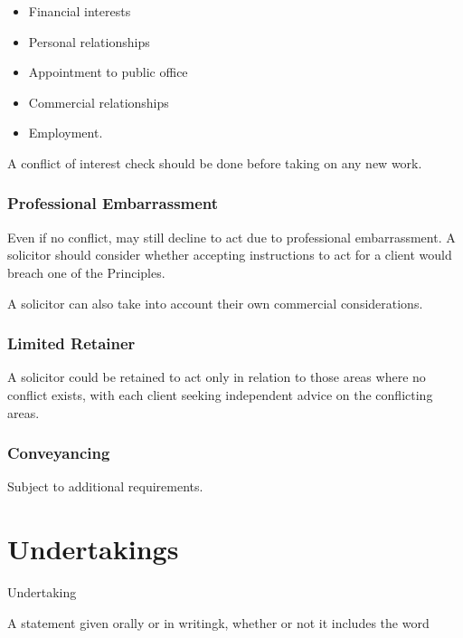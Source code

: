 \documentclass[
]{article}
\providecommand{\tightlist}{%
  \setlength{\itemsep}{0pt}\setlength{\parskip}{0pt}}
\newenvironment{env-86a00e9b-0e00-4fe8-86cd-090a54119c0f}
{
    \savenotes\tcolorbox[blanker,breakable,left=5pt,borderline west={2pt}{-4pt}{gold}]
}
{
    \endtcolorbox\spewnotes
}
\begin{document}
\begin{itemize}
\tightlist
\item
  Financial interests
\item
  Personal relationships
\item
  Appointment to public office
\item
  Commercial relationships
\item
  Employment.
\end{itemize}

A conflict of interest check should be done before taking on any new
work.

\hypertarget{professional-embarrassment-1}{%
\subsubsection{Professional
Embarrassment}\label{professional-embarrassment-1}}

Even if no conflict, may still decline to act due to professional
embarrassment. A solicitor should consider whether accepting
instructions to act for a client would breach one of the Principles.

A solicitor can also take into account their own commercial
considerations.

\hypertarget{limited-retainer}{%
\subsubsection{Limited Retainer}\label{limited-retainer}}

A solicitor could be retained to act only in relation to those areas
where no conflict exists, with each client seeking independent advice on
the conflicting areas.

\hypertarget{conveyancing}{%
\subsubsection{Conveyancing}\label{conveyancing}}

Subject to additional requirements.

\hypertarget{undertakings}{%
\section{Undertakings}\label{undertakings}}

\begin{env-86a00e9b-0e00-4fe8-86cd-090a54119c0f}

Undertaking

A statement given orally or in writingk, whether or not it includes the
word "undertake" or "undertaking" to someone who reasonably places
reliance on it, that you or a third party will do something or cause
something to be done, or refrain from doing something. (SRA Glossary)

\end{env-86a00e9b-0e00-4fe8-86cd-090a54119c0f}
\end{document}
